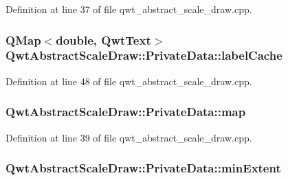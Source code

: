 Definition at line 37 of file qwt\-\_\-abstract\-\_\-scale\-\_\-draw.\-cpp.

\hypertarget{class_qwt_abstract_scale_draw_1_1_private_data_af91fa7fd32ba72b14d042cdd5befd44a}{
\subsubsection[{label\-Cache}]{\setlength{\rightskip}{0pt plus 5cm}Q\-Map$<${\bf double}, {\bf Qwt\-Text}$>$ Qwt\-Abstract\-Scale\-Draw\-::\-Private\-Data\-::label\-Cache}}\label{class_qwt_abstract_scale_draw_1_1_private_data_af91fa7fd32ba72b14d042cdd5befd44a}


Definition at line 48 of file qwt\-\_\-abstract\-\_\-scale\-\_\-draw.\-cpp.

\hypertarget{class_qwt_abstract_scale_draw_1_1_private_data_ac9fc2006eee367798cf851e74d8e8c49}{
\subsubsection[{map}]{ Qwt\-Abstract\-Scale\-Draw\-::\-Private\-Data\-::map}}\label{class_qwt_abstract_scale_draw_1_1_private_data_ac9fc2006eee367798cf851e74d8e8c49}


Definition at line 39 of file qwt\-\_\-abstract\-\_\-scale\-\_\-draw.\-cpp.

\hypertarget{class_qwt_abstract_scale_draw_1_1_private_data_a87d0e1aa52cf5e6b06462d229d7af2b2}{
\subsubsection[{min\-Extent}]{ Qwt\-Abstract\-Scale\-Draw\-::\-Private\-Data\-::min\-Extent}}\label{class_qwt_abstract_scale_draw_1_1_private_data_a87d0e1aa52cf5e6b06462d229d7af2b2}


